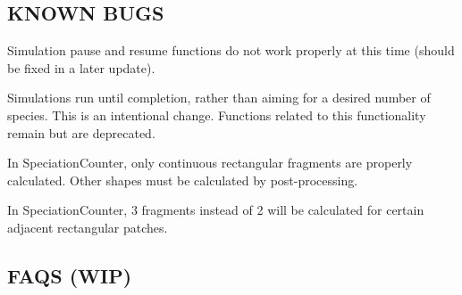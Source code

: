 \subsection*{K\+N\+O\+WN B\+U\+GS}


\begin{DoxyItemize}
\item Simulation pause and resume functions do not work properly at this time (should be fixed in a later update).
\item Simulations run until completion, rather than aiming for a desired number of species. This is an intentional change. Functions related to this functionality remain but are deprecated.
\item In Speciation\+Counter, only continuous rectangular fragments are properly calculated. Other shapes must be calculated by post-\/processing.
\item In Speciation\+Counter, 3 fragments instead of 2 will be calculated for certain adjacent rectangular patches.
\end{DoxyItemize}

\subsection*{F\+A\+QS (W\+IP)}


